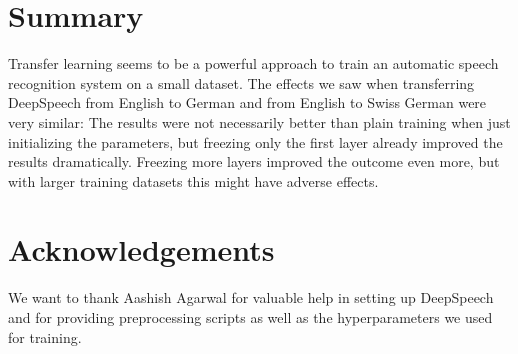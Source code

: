 \documentclass[11pt]{article}
\begin{document}


\section{Summary}
Transfer learning seems to be a powerful approach to train an automatic speech recognition system on a small dataset. The effects we saw when transferring DeepSpeech from English to German and from English to Swiss German were very similar: The results were not necessarily better than plain training when just initializing the parameters, but freezing only the first layer already improved the results dramatically. Freezing more layers improved the outcome even more, but with larger training datasets this might have adverse effects.

\section{Acknowledgements}
We want to thank Aashish Agarwal for valuable help in setting up DeepSpeech and for providing preprocessing scripts as well as the hyperparameters we used for training.

\printbibliography
\end{document}
